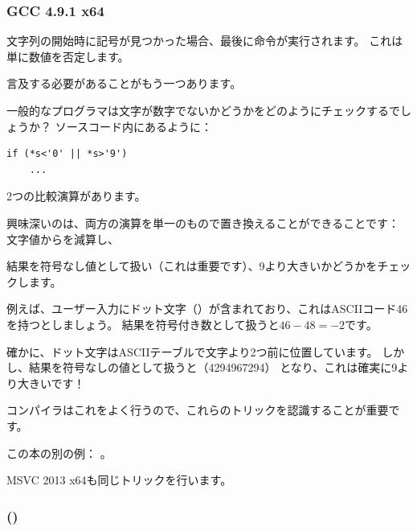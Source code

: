 

\subsubsection{\Optimizing GCC 4.9.1 x64}




文字列の開始時に記号が見つかった場合、最後に命令が実行されます。
これは単に数値を否定します。

\label{one_comparison_instead_of_two}
言及する必要があることがもう一つあります。

一般的なプログラマは文字が数字でないかどうかをどのようにチェックするでしょうか？
ソースコード内にあるように：

\begin{lstlisting}[style=customc]
if (*s<'0' || *s>'9')
    ...
\end{lstlisting}

2つの比較演算があります。

興味深いのは、両方の演算を単一のもので置き換えることができることです：
文字値からを減算し、

結果を符号なし値として扱い（これは重要です）、9より大きいかどうかをチェックします。

例えば、ユーザー入力にドット文字（）が含まれており、これは\ac{ASCII}コード46を持つとしましょう。
結果を符号付き数として扱うと$46-48=-2$です。

確かに、ドット文字は\ac{ASCII}テーブルで文字より2つ前に位置しています。
しかし、結果を符号なしの値として扱うと（4294967294）
となり、これは確実に9より大きいです！

コンパイラはこれをよく行うので、これらのトリックを認識することが重要です。

この本の別の例：
。

\Optimizing MSVC 2013 x64も同じトリックを行います。

\subsubsection{\OptimizingKeilVI (\ARMMode)}



